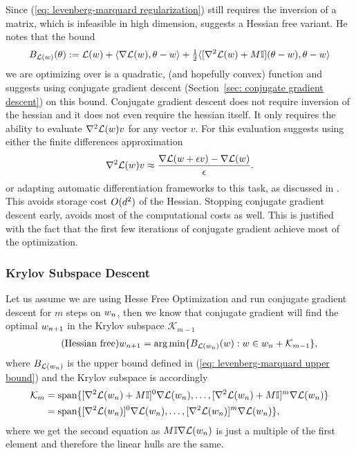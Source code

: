 Since (\ref{eq: levenberg-marquard regularization}) still requires the inversion
of a matrix, which is infeasible in high dimension,
\textcite{martensDeepLearningHessianfree2010} suggests a Hessian free variant.
He notes that the bound
\begin{align}\label{eq: levenberg-marquard upper bound}
	B_{\mathcal{L}(w)}(\theta) := \mathcal{L}(w) + \langle \nabla\mathcal{L}(w), \theta-w \rangle
	+ \tfrac12\langle [\nabla^2\mathcal{L}(w)+M\mathbb{I}](\theta-w), \theta-w \rangle
\end{align}
we are optimizing over is a quadratic, (and hopefully convex) function and
suggests using conjugate gradient descent (Section~\ref{sec: conjugate gradient
descent}) on this bound. Conjugate gradient descent does not require inversion
of the hessian and it does not even require the hessian itself. It only
requires the ability to evaluate \(\nabla^2\mathcal{L}(w)v\) for any vector
\(v\). For this evaluation \textcite{martensDeepLearningHessianfree2010} suggests
using either the finite differences approximation
\begin{align*}
	\nabla^2\mathcal{L}(w) v
	\approx \frac{\nabla\mathcal{L}(w + \epsilon v) - \nabla\mathcal{L}(w)}{\epsilon}.
\end{align*}
or adapting automatic differentiation frameworks to this task, as discussed in
\textcite{pearlmutterFastExactMultiplication1994}. This avoids storage cost
\(O(d^2)\) of the Hessian. Stopping conjugate gradient descent early,
avoids most of the computational costs as well. This is justified with the fact
that the first few iterations of conjugate gradient achieve most of the
optimization.

\subsubsection{Krylov Subspace Descent}

Let us assume we are using Hesse Free Optimization and run conjugate gradient
descent for \(m\) steps on \(w_n\), then we know that conjugate gradient
will find the optimal \(w_{n+1}\) in the Krylov subspace \(\mathcal{K}_{m-1}\)
\begin{align}\label{eq: hessian free next}
	\tag{Hessian free}
	w_{n+1} = \arg\min \{ B_{\mathcal{L}(w_n)}(w) : w \in w_n + \mathcal{K}_{m-1} \},
\end{align}
where \(B_{\mathcal{L}(w_n)}\) is the upper bound defined in (\ref{eq:
levenberg-marquard upper bound}) and the Krylov subspace is accordingly
\begin{align*}
	\mathcal{K}_m
	&= \text{span}\{
		[\nabla^2\mathcal{L}(w_n) + M\mathbb{I}]^0 \nabla\mathcal{L}(w_n), \dots,
		[\nabla^2\mathcal{L}(w_n) + M\mathbb{I}]^m \nabla\mathcal{L}(w_n)
	\}	\\
	&= \text{span}\{
		[\nabla^2\mathcal{L}(w_n)]^0 \nabla\mathcal{L}(w_n), \dots,
		[\nabla^2\mathcal{L}(w_n)]^m \nabla\mathcal{L}(w_n)
	\},
\end{align*}
where we get the second equation as \(M\mathbb{I} \nabla\mathcal{L}(w_n)\) is
just a multiple of the first element and therefore the linear hulls are the
same.

